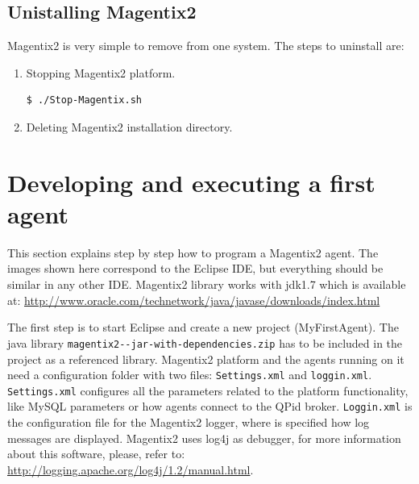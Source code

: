 \subsection{Unistalling Magentix2}

Magentix2 is very simple to remove from one system. The steps to uninstall are:
\begin{enumerate}
\item Stopping Magentix2 platform.
\begin{verbatim}
$ ./Stop-Magentix.sh
\end{verbatim}
\item Deleting Magentix2 installation directory.
\end{enumerate}


\section{Developing and executing a first agent}\label{sec:devel1stAgent}
This section explains step by step how to program a Magentix2 agent. The images shown here correspond to the Eclipse IDE, but everything should be similar in any other IDE. Magentix2 library works with jdk1.7 which is available at: \url{http://www.oracle.com/technetwork/java/javase/downloads/index.html}

The first step is to start Eclipse and create a new project (MyFirstAgent). The java library \texttt{magentix2-\MagentixVersion-jar-with-dependencies.zip} has to be included in the project as a referenced library. Magentix2 platform and the agents running on it need a configuration folder with two files: \texttt{Settings.xml} and \texttt{loggin.xml}. \texttt{Settings.xml} configures all the parameters related to the platform functionality, like MySQL parameters or how agents connect to the QPid broker. \texttt{Loggin.xml} is the configuration file for the Magentix2 logger, where is specified how log messages are displayed. Magentix2 uses log4j as debugger, for more information about this software, please, refer to: \url{http://logging.apache.org/log4j/1.2/manual.html}. 

